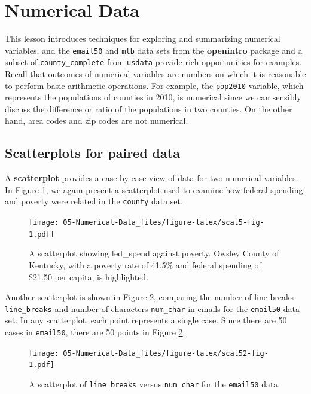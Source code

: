 \documentclass[
]{book}
\begin{document}
\hypertarget{numerical-data}{%
\section{Numerical Data}\label{numerical-data}}

This lesson introduces techniques for exploring and summarizing numerical variables, and the \texttt{email50} and \texttt{mlb} data sets from the \textbf{openintro} package and a subset of \texttt{county\_complete} from \texttt{usdata} provide rich opportunities for examples. Recall that outcomes of numerical variables are numbers on which it is reasonable to perform basic arithmetic operations. For example, the \texttt{pop2010} variable, which represents the populations of counties in 2010, is numerical since we can sensibly discuss the difference or ratio of the populations in two counties. On the other hand, area codes and zip codes are not numerical.

\hypertarget{scatterplots-for-paired-data}{%
\subsection{Scatterplots for paired data}\label{scatterplots-for-paired-data}}

A \textbf{scatterplot} provides a case-by-case view of data for two numerical variables. In Figure \ref{fig:scat5-fig}, we again present a scatterplot used to examine how federal spending and poverty were related in the \texttt{county} data set.

\begin{figure}
\centering
\texttt{[image: 05-Numerical-Data\_files/figure-latex/scat5-fig-1.pdf]}
\caption{\label{fig:scat5-fig}A scatterplot showing fed\_spend against poverty. Owsley County of Kentucky, with a poverty rate of 41.5\% and federal spending of \$21.50 per capita, is highlighted.}
\end{figure}

Another scatterplot is shown in Figure \ref{fig:scat52-fig}, comparing the number of line breaks \texttt{line\_breaks} and number of characters \texttt{num\_char} in emails for the \texttt{email50} data set. In any scatterplot, each point represents a single case. Since there are 50 cases in \texttt{email50}, there are 50 points in Figure \ref{fig:scat52-fig}.

\begin{figure}
\centering
\texttt{[image: 05-Numerical-Data\_files/figure-latex/scat52-fig-1.pdf]}
\caption{\label{fig:scat52-fig}A scatterplot of \texttt{line\_breaks} versus \texttt{num\_char} for the \texttt{email50} data.}
\end{figure}
\end{document}
